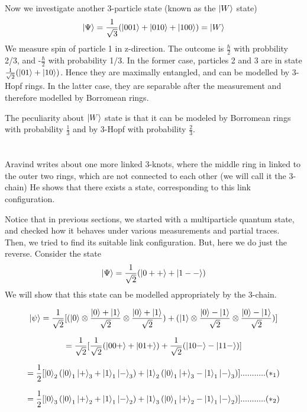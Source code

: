 \documentclass{article}
\begin{document}
\section{}
Now we investigate another 3-particle state (known as the $\ket{W}$ state) 
\[
\ket{\Psi} = \frac{1}{\sqrt{3}} (\ket{001}+\ket{010}+\ket{100}) = \ket{W}
\]
We measure spin of particle 1 in z-direction. The outcome is $\frac{\hbar}{2}$ with probbility 2/3, and -$\frac{\hbar}{2}$ with probability 1/3. In the former case, particles 2 and 3 are in state $\frac{1}{\sqrt{2}}(\ket{01}+\ket{10})$. Hence they are maximally entangled, and can be modelled by 3-Hopf rings. In the latter case, they are separable after the measurement and therefore modelled by Borromean rings.

The peculiarity about $\ket{W}$ state is that it can be modeled by Borromean rings with probability $\frac{1}{3}$ and by 3-Hopf with probability $\frac{2}{3}$.


\section{}

Aravind writes about one more linked 3-knots, where the middle ring in linked to the outer two rings, which are not connected to each other (we will call it the 3-chain) He shows that there exists a state, corresponding to this link configuration.

Notice that in previous sections, we started with a multiparticle quantum state, and checked how it behaves under various measurements and partial traces. Then, we tried to find its suitable link configuration. But, here we do just the reverse. 
Consider the state
\[
\ket{\Psi} = \frac{1}{\sqrt{2}} (\ket{0++}+\ket{1--})
\]
We will show that this state can be modelled appropriately by the 3-chain.

\[
\ket{\psi}= \frac{1}{\sqrt{2}}[(\ket{0}\otimes\frac{\ket{0}+\ket{1}}{\sqrt{2}} \otimes\frac{\ket{0}+\ket{1}}{\sqrt{2}}) + (\ket{1}\otimes\frac{\ket{0}-\ket{1}}{\sqrt{2}}\otimes\frac{\ket{0}-\ket{1}}{\sqrt{2}})]
\]

\[
= \frac{1}{\sqrt{2}}[\frac{1}{\sqrt{2}}(\ket{00+}+\ket{01+})+\frac{1}{\sqrt{2}}(\ket{10-}-\ket{11-})]
\]

\[
= \frac{1}{2}[\ket{0}_2 (\ket{0}_1 \ket{+}_3+\ket{1}_1\ket{-}_3)+\ket{1}_2(\ket{0}_1 \ket{+}_3-\ket{1}_1\ket{-}_3)]...........(*_1)
\]


\[
= \frac{1}{2}[\ket{0}_3 (\ket{0}_1 \ket{+}_2+\ket{1}_1\ket{-}_2)+\ket{1}_3(\ket{0}_1 \ket{+}_2-\ket{1}_1\ket{-}_2)]...........(*_2)
\]
\end{document}
